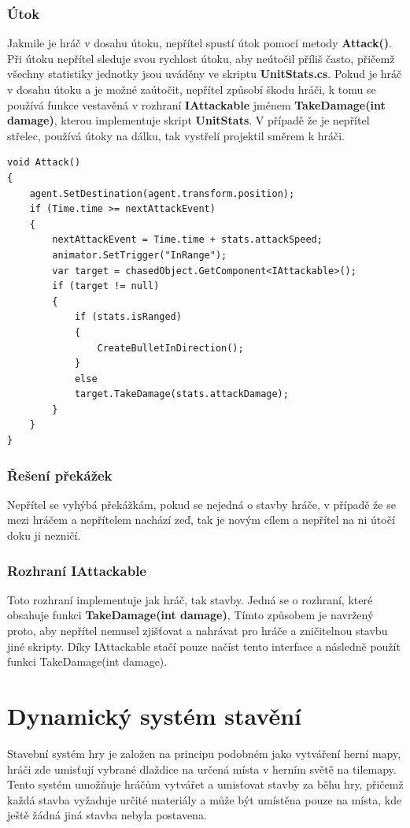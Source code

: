 \subsubsection{Útok}
Jakmile je hráč v dosahu útoku, nepřítel spustí útok pomocí metody \textbf{Attack()}. Při útoku nepřítel sleduje svou rychlost útoku, aby neútočil příliš často, přičemž všechny statistiky jednotky jsou uváděny ve skriptu \textbf{UnitStats.cs}. Pokud je hráč v dosahu útoku a je možné zaútočit, nepřítel způsobí škodu hráči, k tomu se používá funkce vestavěná v rozhraní \textbf{IAttackable} jménem \textbf{TakeDamage(int damage)}, kterou implementuje skript \textbf{UnitStats}. V případě že je nepřítel střelec, používá útoky na dálku, tak vystřelí projektil směrem k hráči.

\begin{lstlisting}
void Attack()
{
	agent.SetDestination(agent.transform.position);
	if (Time.time >= nextAttackEvent)
	{
		nextAttackEvent = Time.time + stats.attackSpeed;
		animator.SetTrigger("InRange");
		var target = chasedObject.GetComponent<IAttackable>();
		if (target != null)
		{
			if (stats.isRanged)
			{
				CreateBulletInDirection();
			}
			else
			target.TakeDamage(stats.attackDamage);
		}
	}
}
\end{lstlisting}

\subsubsection{Řešení překážek}
Nepřítel se vyhýbá překážkám, pokud se nejedná o stavby hráče, v případě že se mezi hráčem a nepřítelem nachází zeď, tak je novým cílem a nepřítel na ni útočí doku ji nezničí.

\subsubsection{Rozhraní IAttackable}
Toto rozhraní implementuje jak hráč, tak stavby. Jedná se o rozhraní, které obsahuje funkci \textbf{TakeDamage(int damage)}, Tímto způsobem je navržený proto, aby nepřítel nemusel zjišťovat a nahrávat pro hráče a zničitelnou stavbu jiné skripty. Díky IAttackable stačí pouze načíst tento interface a následně použít funkci TakeDamage(int damage).

\section{Dynamický systém stavění}
\label{buildingSystem}
Stavební systém hry je založen na principu podobném jako vytváření herní mapy, hráči zde umisťují vybrané dlaždice na určená místa v herním světě na tilemapy. Tento systém umožňuje hráčům vytvářet a umisťovat stavby za běhu hry, přičemž každá stavba vyžaduje určité materiály a může být umístěna pouze na místa, kde ještě žádná jiná stavba nebyla postavena.

